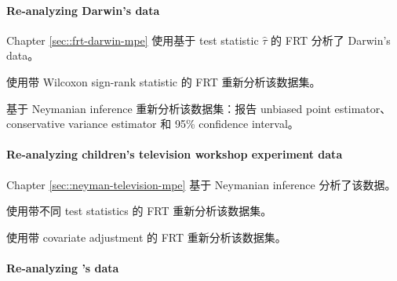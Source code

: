 \paragraph{Re-analyzing Darwin's data}

 
Chapter \ref{sec::frt-darwin-mpe} 使用基于 test statistic $\hat{\tau}$ 的 FRT 分析了 Darwin's data。

使用带 Wilcoxon sign-rank statistic 的 FRT 重新分析该数据集。

基于 Neymanian inference 重新分析该数据集：报告 unbiased point estimator、conservative variance estimator 和 95\% confidence interval。

\paragraph{Re-analyzing children's television workshop experiment data}

Chapter \ref{sec::neyman-television-mpe} 基于 Neymanian inference 分析了该数据。

使用带不同 test statistics 的 FRT 重新分析该数据集。

使用带 covariate adjustment 的 FRT 重新分析该数据集。




\paragraph{Re-analyzing \citet{angrist2009effects}'s data}\label{para::AL-mpe-neyman}

